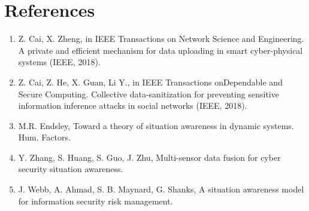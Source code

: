 \documentclass[paper=a4, fontsize=11pt]{scrartcl}
\numberwithin{equation}{section}		%
\numberwithin{figure}{section}			%
\numberwithin{table}{section}				%
\begin{document}
\section{References}
\begin{enumerate}
    \item Z. Cai, X. Zheng, in IEEE Transactions on Network Science and Engineering. A private and efficient mechanism for data uploading in smart cyber-physical systems (IEEE, 2018).
    \item Z. Cai, Z. He, X. Guan, Li Y., in IEEE Transactions onDependable and Secure Computing. Collective data-sanitization for preventing sensitive information inference attacks in social networks (IEEE, 2018).
    \item M.R. Endsley, Toward a theory of situation awareness in dynamic systems. Hum. Factors.
    \item Y. Zhang, S. Huang, S. Guo, J. Zhu, Multi-sensor data fusion for cyber security situation awareness.
    \item J. Webb, A. Ahmad, S. B. Maynard, G. Shanks, A situation awareness model for information security risk management.
\end{enumerate}
\end{document}
